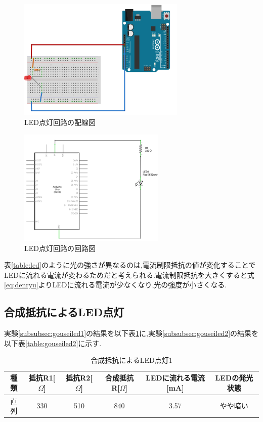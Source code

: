 \documentclass{jarticle}
\begin{document}
\begin{figure}[H]
\begin{center}
\includegraphics[width=8.0cm]{images/kadai2-1-2_ブレッドボード.png}
\caption{LED点灯回路の配線図}
\label{fig:2-1-2bread}
\end{center}
\end{figure}

\begin{figure}[H]
\begin{center}
\includegraphics[width=7.0cm]{images/kadai2-1-2_回路図.png}
\caption{LED点灯回路の回路図}
\label{fig:2-1-2kairo}
\end{center}
\end{figure}

表\ref{table:led}のように光の強さが異なるのは,電流制限抵抗の値が変化することでLEDに流れる電流が変わるためだと考えられる.電流制限抵抗を大きくすると式\ref{eq:denryu}よりLEDに流れる電流が少なくなり,光の強度が小さくなる.

\subsection{合成抵抗によるLED点灯}
実験\ref{subsubsec:gouseiled1}の結果を以下表\ref{table:gouseiled1}に,実験\ref{subsubsec:gouseiled2}の結果を以下表\ref{table:gouseiled2}に示す.

\begin{table}[H]
\centering
\caption{合成抵抗によるLED点灯1}
\label{table:gouseiled1}
\begin{center}
\begin{tabular}{c|c|c|c|c|c}
\hline \hline
種類 & 抵抗R1[$\Omega$] & 抵抗R2[$\Omega$]&合成抵抗R[$\Omega$]&LEDに流れる電流[mA] &LEDの発光状態\\ \hline
直列 & 330 &510&840&3.57&やや暗い \\ \hline
\end{tabular}
\end{center}
\end{table}
\end{document}
